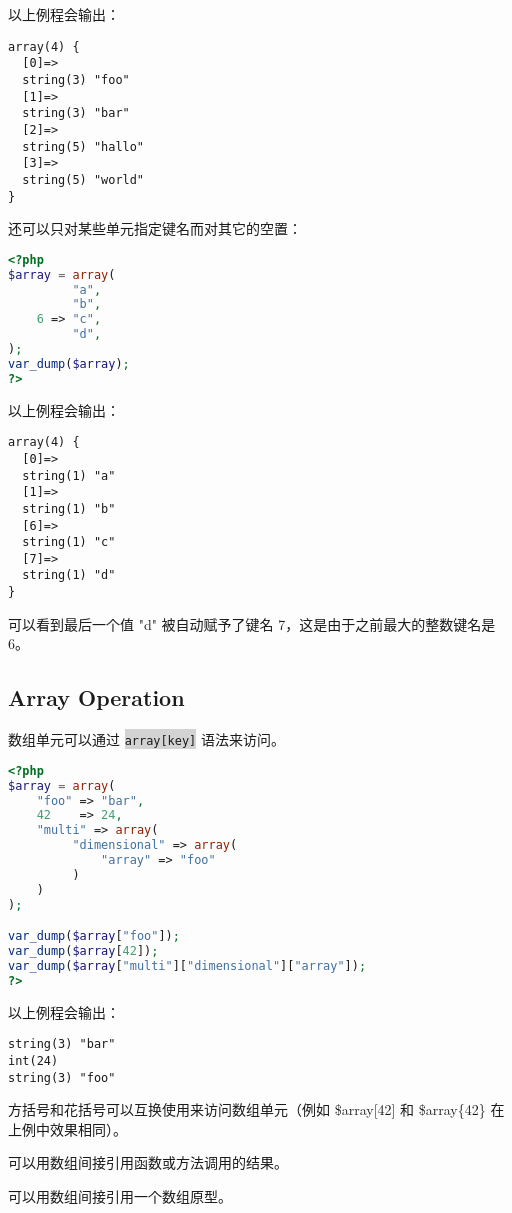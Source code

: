 以上例程会输出：


\begin{verbatim}
array(4) {
  [0]=>
  string(3) "foo"
  [1]=>
  string(3) "bar"
  [2]=>
  string(5) "hallo"
  [3]=>
  string(5) "world"
}
\end{verbatim}

还可以只对某些单元指定键名而对其它的空置：

\begin{lstlisting}[language=PHP]
<?php
$array = array(
         "a",
         "b",
    6 => "c",
         "d",
);
var_dump($array);
?>
\end{lstlisting}


以上例程会输出：


\begin{verbatim}
array(4) {
  [0]=>
  string(1) "a"
  [1]=>
  string(1) "b"
  [6]=>
  string(1) "c"
  [7]=>
  string(1) "d"
}
\end{verbatim}

可以看到最后一个值 "d" 被自动赋予了键名 7，这是由于之前最大的整数键名是 6。

\subsection{Array Operation}

数组单元可以通过 \colorbox{lightgray}{\texttt{array[key]}} 语法来访问。

\begin{lstlisting}[language=PHP]
<?php
$array = array(
    "foo" => "bar",
    42    => 24,
    "multi" => array(
         "dimensional" => array(
             "array" => "foo"
         )
    )
);

var_dump($array["foo"]);
var_dump($array[42]);
var_dump($array["multi"]["dimensional"]["array"]);
?>
\end{lstlisting}

以上例程会输出：


\begin{verbatim}
string(3) "bar"
int(24)
string(3) "foo"
\end{verbatim}

方括号和花括号可以互换使用来访问数组单元（例如 \$array[42] 和 \$array\{42\} 在上例中效果相同）。

\begin{compactitem}
\item 可以用数组间接引用函数或方法调用的结果。
\item 可以用数组间接引用一个数组原型。
\end{compactitem}


